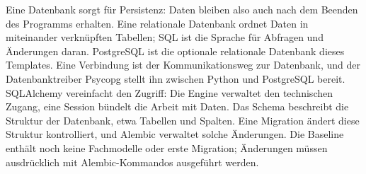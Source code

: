 \begin{beginnerstatement}

Eine Datenbank sorgt für Persistenz: Daten bleiben also auch nach dem Beenden
des Programms erhalten. Eine relationale Datenbank ordnet Daten in miteinander
verknüpften Tabellen; SQL ist die Sprache für Abfragen und Änderungen daran.
PostgreSQL ist die optionale relationale Datenbank dieses Templates. Eine
Verbindung ist der Kommunikationsweg zur Datenbank, und der Datenbanktreiber
Psycopg stellt ihn zwischen Python und PostgreSQL bereit. SQLAlchemy vereinfacht
den Zugriff: Die Engine verwaltet den technischen Zugang, eine Session bündelt
die Arbeit mit Daten. Das Schema beschreibt die Struktur der Datenbank, etwa
Tabellen und Spalten. Eine Migration ändert diese Struktur kontrolliert, und
Alembic verwaltet solche Änderungen. Die Baseline enthält noch keine
Fachmodelle oder erste Migration; Änderungen müssen ausdrücklich mit
Alembic-Kommandos ausgeführt werden.

\end{beginnerstatement}
